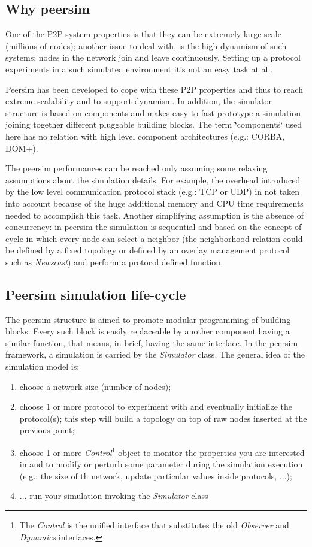 \documentclass[a4paper,11pt]{article}
\begin{document}
\subsection{Why peersim}

One of the P2P system properties is that they can be extremely large
scale (millions of nodes); another issue to deal with, is the high
dynamism of such systems: nodes in the network join and leave continuously.
Setting up a protocol experiments in a such simulated environment it's
not an easy task at all.

Peersim has been developed to cope with these P2P properties and thus
to reach extreme scalability and to support dynamism. In addition,
the simulator structure is based on components and makes easy to fast
prototype a simulation joining together different pluggable building
blocks. The term \char`\"{}components\char`\"{} used here has no relation
with high level component architectures (e.g.: CORBA, DOM+).

The peersim performances can be reached only assuming some relaxing
assumptions about the simulation details. For example, the overhead
introduced by the low level communication protocol stack (e.g.: TCP
or UDP) in not taken into account because of the huge additional memory
and CPU time requirements needed to accomplish this task. Another simplifying
assumption is the absence of concurrency: in peersim the simulation
is sequential and based on the concept of cycle in which every node
can select a neighbor (the neighborhood relation could be defined
by a fixed topology or defined by an overlay management protocol such
as \emph{Newscast}) and perform a protocol defined function.


\subsection{Peersim simulation life-cycle}

The peersim structure is aimed to promote modular programming of building
blocks. Every such block is easily replaceable by another component
having a similar function, that means, in brief, having the same interface.
In the peersim framework, a simulation is carried by the \emph{Simulator}
class. The general idea of the simulation model is: 

\begin{enumerate}
\item choose a network size (number of nodes); 
\item choose 1 or more protocol to experiment with and eventually initialize
the protocol(s); this step will build a topology on top of raw nodes
inserted at the previous point;
\item choose 1 or more \emph{Control}\footnote{The \emph{Control} is
  the unified interface that substitutes the old \emph{Observer} and
  \emph{Dynamics} interfaces.}
 object to monitor the properties
  you are interested in and to modify or perturb some parameter during
  the simulation execution (e.g.: the size of th
network, update particular values inside protocols, ...); 
\item ... run your simulation invoking the \emph{Simulator} class
\end{enumerate}
\end{document}

